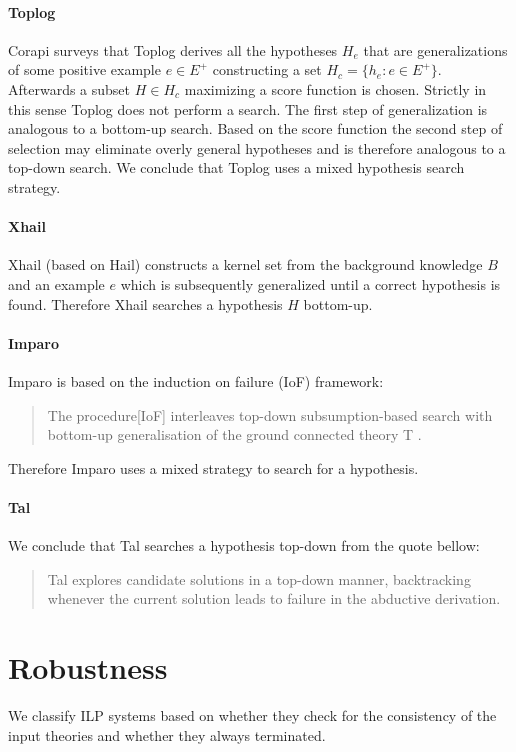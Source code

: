 \paragraph{Toplog\cite{muggleton2008toplog}}
Corapi\cite{corapi2011nonmonotonic} surveys that Toplog derives all the hypotheses $H_e$ that are generalizations of some positive example $e \in E^+$ constructing a set $H_c=\{h_e:e \in E^+\}$.
Afterwards a subset $H \in H_c$ maximizing a score function is chosen. Strictly in this sense Toplog does not perform a search. The first step of generalization is analogous to a bottom-up search. Based on the score function the second step of selection may eliminate overly general hypotheses and is therefore analogous to a top-down search. We conclude that Toplog uses a mixed hypothesis search strategy.
\paragraph{Xhail\cite{ray2003hybrid}}
Xhail (based on Hail) constructs a kernel set from the background knowledge $B$ and an example $e$ which is subsequently generalized until a correct hypothesis is found. Therefore Xhail searches a hypothesis $H$ bottom-up.

\paragraph{Imparo}
Imparo is based on the induction on failure (IoF) framework:
\begin{quote}\cite{kimber2012learning}
The procedure[IoF] interleaves top-down subsumption-based search with bottom-up generalisation of the ground connected theory T .
\end{quote}
Therefore Imparo uses a mixed strategy to search for a hypothesis.
\paragraph{Tal}
We conclude that Tal searches a hypothesis top-down from the quote bellow:
\begin{quote}\cite{corapi2010inductive}
Tal explores candidate solutions in a top-down manner,
backtracking whenever the current solution leads to failure in the abductive derivation.
\end{quote}

\section{Robustness}
We classify ILP systems based on whether they check for the consistency of the input theories and whether they always terminated.

